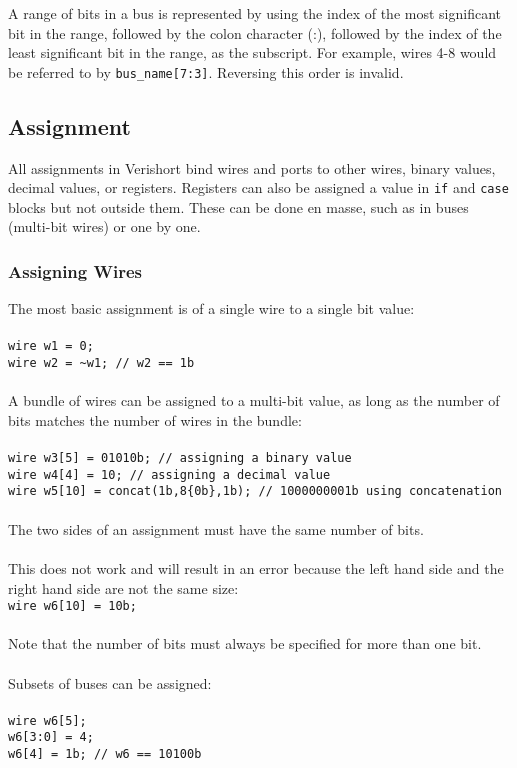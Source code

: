 \documentclass[letterpaper,11pt]{article}
\begin{document}
        A range of bits in a bus is represented by using the index of the most significant bit in the 
        range, followed by the colon character (:), followed by the index of the least significant 
        bit in the range, as the subscript. For example, wires 4-8 would be referred to by \texttt{bus\_name[7:3]}. 
        Reversing this order is invalid.
        
    \subsection{Assignment}
    All assignments in Verishort bind wires and ports to other wires, binary values, decimal values, or registers.  Registers can also be assigned a value in \texttt{if} and \texttt{case} blocks but not outside them. 
    These can be done en masse, such as in buses (multi-bit wires) or one by one.
    
        \subsubsection{Assigning Wires}
        
        The most basic assignment is of a single wire to a single bit value: \\\\
        \texttt{wire w1 = 0;}  \\
        \texttt{wire w2 = \textasciitilde w1;     // w2 == 1b}\\\\
        A bundle of wires can be assigned to a multi-bit value, as long as the number of bits matches 
        the number of wires in the bundle: \\\\
        \texttt{wire w3[5] = 01010b;	 // assigning a binary value} \\
        \texttt{wire w4[4] = 10;       // assigning a decimal value} \\
        \texttt{wire w5[10] = concat(1b,8\{0b\},1b);	// 1000000001b using concatenation} \\\\
		The two sides of an assignment must have the same number of bits. \\\\        
        This does not work and will result in an error because the left hand side and the right hand 
        side are not the same size:\\
        \texttt{wire w6[10] = 10b;} \\\\
        Note that the number of bits must always be specified for more than one bit. \\\\
        Subsets of buses can be assigned: \\\\
        \texttt{wire w6[5];} \\
        \texttt{w6[3:0] = 4;} \\ 
        \texttt{w6[4] = 1b; // w6 == 10100b} \\ 
\end{document}
